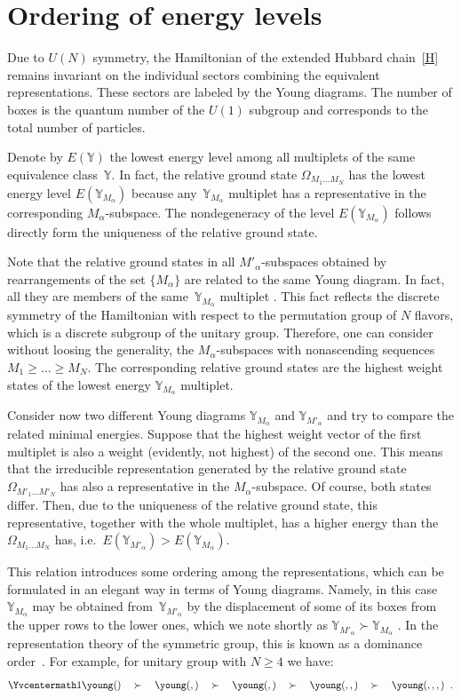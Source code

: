 \documentclass[11pt]{article}
\newcommand{\yn}{\mathbb{Y}}
\newcommand{\yc}{\Yvcentermath1}
\newcommand{\mb}{\mbox{}}
\begin{document}
\section{Ordering of energy levels}\label{section5}


Due to $U(N)$ symmetry, the Hamiltonian of the extended Hubbard chain~\eqref{H}
remains invariant on the individual sectors  combining the equivalent
representations. These sectors are labeled by the Young diagrams.
The number of boxes is the quantum number of the $U(1)$ subgroup and corresponds
to the total number of particles.

Denote by $E(\yn)$ the lowest energy level among
all  multiplets of the same equivalence class~$\yn$.
In fact, the relative ground state $\Omega_{M_1\dots M_N}$ has the lowest energy
level $E(\yn_{M_\alpha})$ because any~$\yn_{M_\alpha}$ multiplet has a representative
in the corresponding $M_\alpha$-subspace. The nondegeneracy of the level  $E(\yn_{M_\alpha})$
follows directly form the uniqueness of the relative ground state.

Note that the relative ground states in all $M'_{\alpha}$-subspaces obtained by
rearrangements of the set $\{M_\alpha\}$ are related to the same Young diagram.
In fact, all they are members of the same~$\yn_{M_\alpha}$ multiplet \cite{H04}.
This fact ref\/lects the discrete symmetry of the Hamiltonian  with  respect to
the permutation group of $N$ f\/lavors, which is a discrete subgroup of the unitary group.
Therefore, one can consider without loosing the generality, the $M_\alpha$-subspaces
with nonascending sequences $M_1\ge\dots\ge M_N$.
The corresponding relative ground states are the highest weight states of the
lowest energy $\yn_{M_\alpha}$ multiplet.

Consider now two dif\/ferent Young diagrams $\yn_{M_\alpha}$ and $\yn_{M'_\alpha}$
and try to compare the related minimal energies.
Suppose that  the highest weight vector of the f\/irst multiplet is also a weight (evidently, not
highest) of the second one.
This means that the irreducible representation generated by the relative
ground state  $\Omega_{M'_1\dots M'_N}$ has also a representative in the
$M_\alpha$-subspace. Of course, both states dif\/fer. Then, due to
the uniqueness of the relative ground state,  this representative, together
with the whole multiplet, has a higher energy  than the $\Omega_{M_1\dots M_N}$ has,
i.e.\
$E(\yn_{M'_\alpha})>E(\yn_{M_\alpha})$.

This relation introduces some ordering among the representations,
which can be formulated in an elegant way in terms
of  Young diagrams. Namely, in this case $\yn_{M_\alpha}$ may be obtained from~$\yn_{M'_\alpha}$ by the displacement of some of its boxes from the upper rows to the lower ones,
which we note shortly as $\yn_{M'_\alpha}\succ\yn_{M_\alpha}$ \cite{H04}.
In the representation theory of the symmetric group, this is known as a dominance
order~\cite{Mac}.
For example, for unitary group with $N\ge 4$ we have:
\[
{\yc
\young(\mb\mb\mb\mb) \quad \succ \quad
\young(\mb\mb\mb,\mb) \quad \succ \quad
\young(\mb\mb,\mb\mb)\quad \succ \quad
\young(\mb\mb,\mb,\mb) \quad \succ \quad
\young(\mb,\mb,\mb,\mb)
\;\; .
}
\]
\end{document}
